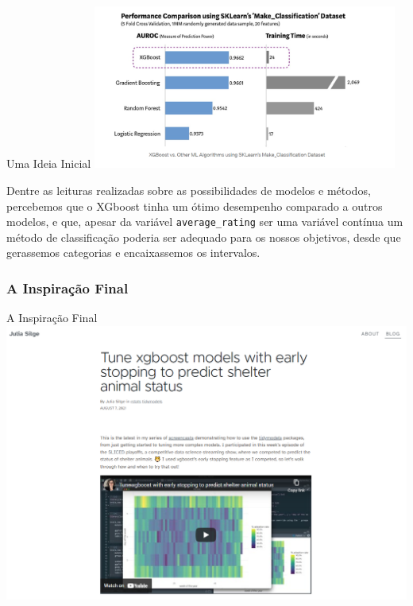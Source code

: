 \documentclass[
  9 pt,
  ignorenonframetext,
]{beamer}
\begin{document}
\begin{frame}[fragile]{Uma Ideia Inicial}
\includegraphics[width=0.75\textwidth,height=\textheight]{./Imagens/desempenho_xgboost_comparacao.png}

Dentre as leituras realizadas sobre as possibilidades de modelos e
métodos, percebemos que o XGboost tinha um ótimo desempenho comparado a
outros modelos, e que, apesar da variável \texttt{average\_rating} ser
uma variável contínua um método de classificação poderia ser adequado
para os nossos objetivos, desde que gerassemos categorias e
encaixassemos os intervalos.
\end{frame}

\hypertarget{a-inspirauxe7uxe3o-final}{%
\subsubsection{A Inspiração Final}\label{a-inspirauxe7uxe3o-final}}

\begin{frame}{A Inspiração Final}
\includegraphics[width=\textwidth,height=0.9\textheight]{./Imagens/xgboost_juliasilge.png}
\end{frame}
\end{document}
